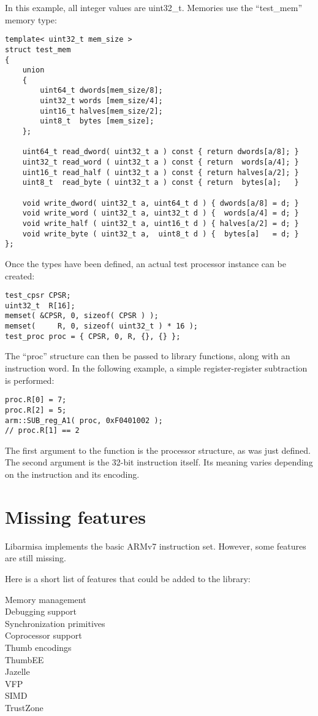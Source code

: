 \documentclass[letterpaper,12pt]{article}
\begin{document}
In this example, all integer values are uint32\_t. Memories use the
``test\_mem'' memory type:
\begin{verbatim}
template< uint32_t mem_size >
struct test_mem
{
    union
    {
        uint64_t dwords[mem_size/8];
        uint32_t words [mem_size/4];
        uint16_t halves[mem_size/2];
        uint8_t  bytes [mem_size];
    };

    uint64_t read_dword( uint32_t a ) const { return dwords[a/8]; }
    uint32_t read_word ( uint32_t a ) const { return  words[a/4]; }
    uint16_t read_half ( uint32_t a ) const { return halves[a/2]; }
    uint8_t  read_byte ( uint32_t a ) const { return  bytes[a];   }

    void write_dword( uint32_t a, uint64_t d ) { dwords[a/8] = d; }
    void write_word ( uint32_t a, uint32_t d ) {  words[a/4] = d; }
    void write_half ( uint32_t a, uint16_t d ) { halves[a/2] = d; }
    void write_byte ( uint32_t a,  uint8_t d ) {  bytes[a]   = d; }
};
\end{verbatim}

Once the types have been defined, an actual test processor instance
can be created:
\begin{verbatim}
test_cpsr CPSR;
uint32_t  R[16];
memset( &CPSR, 0, sizeof( CPSR ) );
memset(     R, 0, sizeof( uint32_t ) * 16 );
test_proc proc = { CPSR, 0, R, {}, {} };
\end{verbatim}

The ``proc'' structure can then be passed to library functions, along
with an instruction word. In the following example, a simple
register-register subtraction is performed:
\begin{verbatim}
proc.R[0] = 7;
proc.R[2] = 5;
arm::SUB_reg_A1( proc, 0xF0401002 );
// proc.R[1] == 2
\end{verbatim}

The first argument to the function is the processor structure, as was
just defined. The second argument is the 32-bit instruction
itself. Its meaning varies depending on the instruction and its
encoding.

\section{Missing features}
\label{sec:features}

Libarmisa implements the basic ARMv7 instruction set. However, some
features are still missing.

Here is a short list of features that could be added to the library:
\begin{description}
\item[Memory management]
\item[Debugging support]
\item[Synchronization primitives]
\item[Coprocessor support]
\item[Thumb encodings]
\item[ThumbEE]
\item[Jazelle]
\item[VFP]
\item[SIMD]
\item[TrustZone]
\end{description}
\end{document}
